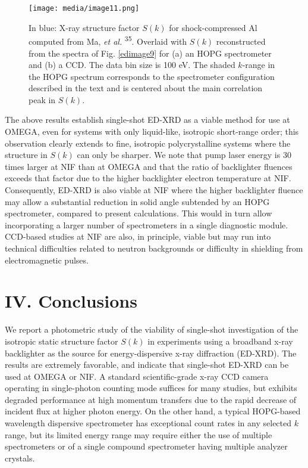 \begin{figure}[h] 
\caption{ In blue: X-ray structure factor \(S(k)\) for shock-compressed
Al computed from Ma, \emph{et al.}
{\textsuperscript{35}}.
Overlaid with \(S(k)\) reconstructed from the spectra of Fig. \ref{edimage9} for (a)
an HOPG spectrometer and (b) a CCD. The data bin size is 100 eV. The
shaded \(k\)-range in the HOPG spectrum corresponds to the spectrometer
configuration described in the text and is centered about the main
correlation peak in \(S(k)\).}
\label{edimage11}
\centering
\texttt{[image: media/image11.png]}
\end{figure}
The above results establish single-shot ED-XRD as a viable method for
use at OMEGA, even for systems with only liquid-like, isotropic
short-range order; this observation clearly extends to fine, isotropic
polycrystalline systems where the structure in \(S(k)\) can only be
sharper. We note that pump laser energy is 30 times larger at NIF than
at OMEGA and that the ratio of backlighter fluences exceeds that factor
due to the higher backlighter electron temperature at NIF.
 \cite{MADDOX2011ABSOLUTE}
Consequently, ED-XRD is also viable at NIF where the higher backlighter
fluence may allow a substantial reduction in solid angle subtended by an
HOPG spectrometer, compared to present calculations. This would in turn
allow incorporating a larger number of spectrometers in a single
diagnostic module. CCD-based studies at NIF are also, in principle,
viable but may run into technical difficulties related to neutron
backgrounds or difficulty in shielding from electromagnetic pulses.

\section{IV. Conclusions}

We report a photometric study of the viability of single-shot
investigation of the isotropic static structure factor \(S(k)\) in
experiments using a broadband x-ray backlighter as the source for
energy-dispersive x-ray diffraction (ED-XRD). The results are extremely
favorable, and indicate that single-shot ED-XRD can be used at OMEGA or
NIF. A standard scientific-grade x-ray CCD camera operating in
single-photon counting mode suffices for many studies, but exhibits
degraded performance at high momentum transfers due to the rapid
decrease of incident flux at higher photon energy. On the other hand, a
typical HOPG-based wavelength dispersive spectrometer has exceptional
count rates in any selected \(k\) range, but its limited energy range
may require either the use of multiple spectrometers or of a single
compound spectrometer having multiple analyzer crystals.

